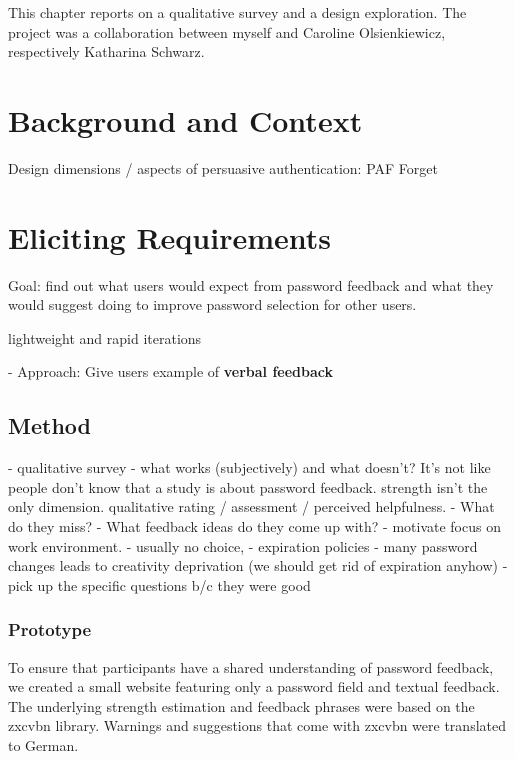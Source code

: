 This chapter reports on a qualitative survey and a design exploration. The project was a collaboration between myself and Caroline Olsienkiewicz, respectively Katharina Schwarz. 

\section{Background and Context}

Design dimensions / aspects of persuasive authentication: PAF Forget \etal \cite{Forget2007PersuasionEducationSecurity}


\section{Eliciting Requirements}
Goal: find out what users would expect from password feedback and what they would suggest doing to improve password selection for other users. 
 
lightweight and rapid iterations

- Approach: Give users example of \textbf{verbal feedback} 
\subsection{Method}
- qualitative survey 
	- what works (subjectively) and what doesn't? It's not like people don't know that a study is about password feedback. strength isn't the only dimension. qualitative rating / assessment / perceived helpfulness.
- What do they miss? 
- What feedback ideas do they come up with?
- motivate focus on work environment.
- usually no choice,
- expiration policies
- many password changes leads to creativity deprivation (we should get rid of expiration anyhow)
- pick up the specific questions b/c they were good

\subsubsection{Prototype}
To ensure that participants have a shared understanding of password feedback, we created a small website featuring only a password field and textual feedback. The underlying strength estimation and feedback phrases were based on the zxcvbn library. Warnings and suggestions that come with zxcvbn were translated to German. 

